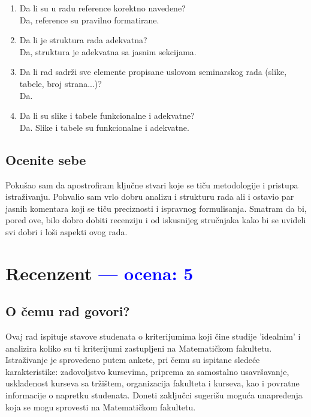\documentclass[a4paper]{report}
\newcommand{\odgovor}[1]{\textcolor{blue}{#1}}
\begin{document}
\begin{enumerate}
 \item Da li su u radu reference korektno navedene?\\
 Da, reference su pravilno formatirane.
 
 \item Da li je struktura rada adekvatna?\\
 Da, struktura je adekvatna sa jasnim sekcijama.
 
 \item Da li rad sadrži sve elemente propisane uslovom seminarskog rada (slike, tabele, broj strana...)?\\
 Da.
 
 \item Da li su slike i tabele funkcionalne i adekvatne?\\
 Da. Slike i tabele su funkcionalne i adekvatne.
 
 \end{enumerate}
 
 \section{Ocenite sebe}
 Pokušao sam da apostrofiram ključne stvari koje se tiču metodologije i pristupa istraživanju. Pohvalio sam vrlo dobru analizu i strukturu rada ali i ostavio par jasnih komentara koji se tiču preciznosti i ispravnog formulisanja. Smatram da bi, pored ove, bilo dobro dobiti recenziju i od iskusnijeg stručnjaka kako bi se uvideli svi dobri i loši aspekti ovog rada. 
 \chapter{Recenzent \odgovor{--- ocena: 5} }
 
 
 \section{O čemu rad govori?}
 Ovaj rad ispituje stavove studenata o kriterijumima koji čine studije 'idealnim' i analizira koliko su ti kriterijumi zastupljeni na Matematičkom fakultetu. Istraživanje je sprovedeno putem ankete, pri čemu su ispitane sledeće karakteristike: zadovoljstvo kursevima, priprema za samostalno usavršavanje, usklađenost kurseva sa tržištem, organizacija fakulteta i kurseva, kao i povratne informacije o napretku studenata. Doneti zaključci sugerišu moguća unapređenja koja se mogu sprovesti na Matematičkom fakultetu.
 
\end{document}
